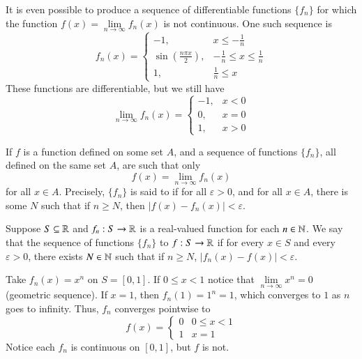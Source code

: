 \begin{eg}
    It is even possible to produce a sequence of differentiable functions $\{f_n\}$ for which the function $f(x) = \lim\limits_{n\rightarrow \infty}f_n(x)$ is not continuous. One such sequence is \begin{equation*}
        f_n(x) = \left\{\begin{array}{lc} -1, &  x \leq -\frac{1}{n} \\ \sin\left(\frac{n\pi x}{2}\right), & -\frac{1}{n} \leq x \leq \frac{1}{n} \\ 1, & \frac{1}{n} \leq x \end{array}\right.
    \end{equation*}
    These functions are differentiable, but we still have  \begin{equation*}
        \lim\limits_{n\rightarrow \infty}f_n(x) = \left\{\begin{array}{lc} -1, & x < 0 \\ 0, & x = 0 \\ 1, & x > 0 \end{array}\right.
    \end{equation*}
\end{eg}

\begin{defn}
    If $f$ is a function defined on some set $A$, and a sequence of functions $\{f_n\}$, all defined on the same set $A$, are such that only \begin{equation*}
        f(x) = \lim\limits_{n\rightarrow \infty}f_n(x)
    \end{equation*}
    for all $x \in A$. Precisely, $\{f_n\}$ is said to  if for all $\varepsilon > 0$, and for all $x \in A$, there is some $N$ such that if $n \geq N$, then $|f(x) - f_n(x)| < \varepsilon$.
\end{defn}

\begin{defn}
    Suppose $S \subseteq \mathbb R$ and $f_n:S\rightarrow \mathbb R$ is a real-valued function for each $n \in \mathbb N$. We say that the sequence of functions $\{f_n\}$  to $f:S\rightarrow \mathbb R$ if for every $x \in S$ and every $\varepsilon > 0$, there exists $N \in \mathbb N$ such that if $n \geq N$, $|f_n(x) - f(x)| < \varepsilon$.
\end{defn}

\begin{eg}
    Take $f_n(x) = x^n$ on $S = [0,1]$. If $0 \leq x < 1$ notice that $\lim\limits_{n\rightarrow \infty}x^n = 0$ (geometric sequence). If $x = 1$, then $f_n(1) = 1^n = 1$, which converges to $1$ as $n$ goes to infinity. Thus, $f_n$ converges pointwise to \begin{equation*}
        f(x) = \left\{\begin{array}{lc} 0 & 0 \leq x < 1 \\ 1 & x = 1\end{array}\right.
    \end{equation*}
    Notice each $f_n$ is continuous on $[0,1]$, but $f$ is not.
\end{eg}

